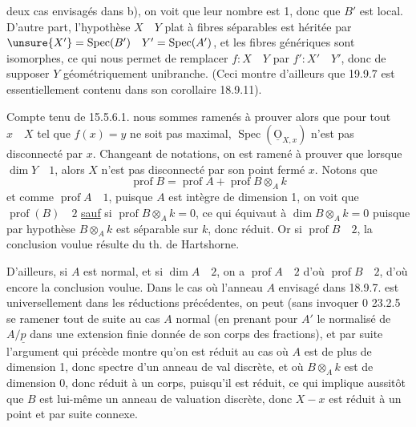 deux cas envisagés dans b), on voit que leur nombre est 1, donc que $B'$ est local. D'autre part, l'hypothèse $X\quad Y$ plat à fibres séparables est héritée par $\unsure{X'}=\operatorname{Spec}(B')\quad Y'=\operatorname{Spec}(A')$, et les fibres génériques sont isomorphes, ce qui nous permet de remplacer $f:X\quad Y$ par $f':X'\quad Y'$, donc de supposer $Y$ géométriquement unibranche. (Ceci montre d'ailleurs que 19.9.7 est essentiellement contenu dans son corollaire 18.9.11).

Compte tenu de 15.5.6.1. nous sommes ramenés à prouver alors que pour tout $x\quad X$ tel que $f(x)=y$ ne soit pas maximal, $\operatorname{Spec}(\underline{\mathrm O}_{X,x})$ n'est pas disconnecté par $x$. Changeant de notations, on est ramené à prouver que lorsque $\dim Y\quad1$, alors $X$ n'est pas disconnecté par son point fermé $x$. Notons que
\[
\operatorname{prof}B=\operatorname{prof}A+\operatorname{prof}B\otimes_A k
\]
et comme $\operatorname{prof}A\quad1$, puisque $A$ est intègre de dimension 1, on voit que $\operatorname{prof}(B)\quad2$ \uline{sauf} si $\operatorname{prof}B\otimes_A k=0$, ce qui équivaut à $\dim B\otimes_A k=0$ puisque par hypothèse $B\otimes_A k$ est séparable sur $k$, donc  réduit. Or si $\operatorname{prof}B\quad2$, la conclusion voulue résulte du th. de Hartshorne. 

D'ailleurs, si $A$ est normal,  et si $\dim A\quad2$, on a $\operatorname{prof}A\quad2$ d'où $\operatorname{prof}B\quad2$, d'où encore la conclusion voulue. Dans le cas où l'anneau $A$ envisagé dans 18.9.7. est universellement    dans les réductions précédentes, on peut (sans invoquer 0 23.2.5\unsure{)} se ramener  tout de suite au cas $A$ normal (en prenant pour $A'$ le normalisé de $A/\underline p$ dans une extension finie donnée de son corps des fractions), et par suite  l'argument qui précède montre qu'on est réduit au cas où $A$ est de plus de dimension 1, donc spectre d'un anneau de val discrète, et où $B\otimes_A k$ est de dimension 0, donc réduit à un corps, puisqu'il est réduit, ce qui implique aussitôt que $B$ est lui-même un anneau de valuation discrète, donc $X-x$ est réduit à un point et par suite connexe.
